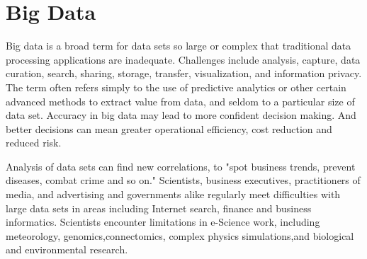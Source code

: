\documentclass[a4paper,12pt,oneside]{book}
\begin{document}
\chapter{\E Big Data}
Big data is a broad term for data sets so large or complex that traditional data processing applications are inadequate. Challenges include analysis, capture, data curation, search, sharing, storage, transfer, visualization, and information privacy. The term often refers simply to the use of predictive analytics or other certain advanced methods to extract value from data, and seldom to a particular size of data set. Accuracy in big data may lead to more confident decision making. And better decisions can mean greater operational efficiency, cost reduction and reduced risk.

Analysis of data sets can find new correlations, to "spot business trends, prevent diseases, combat crime and so on." Scientists, business executives, practitioners of media, and advertising and governments alike regularly meet difficulties with large data sets in areas including Internet search, finance and business informatics. Scientists encounter limitations in e-Science work, including meteorology, genomics,connectomics, complex physics simulations,and biological and environmental research.\cite{wiki:xxx}
\end{document}
